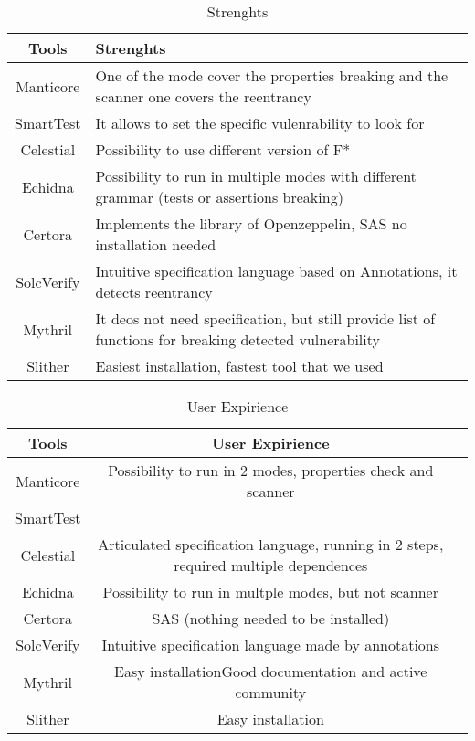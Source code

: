 \begin{table*}
\caption{Strenghts}
    \label{tab:Strenghts}
    \begin{tabular}{cl}
    \toprule
        Tools  &  Strenghts \\
        \midrule
        Manticore & One of the mode cover the properties breaking and the scanner one covers the reentrancy\\
        SmartTest & It allows to set the specific vulenrability to look for  \\
        Celestial & Possibility to use different version of F*  \\
        Echidna &  Possibility to run in multiple modes with different grammar (tests or assertions breaking)\\
        Certora & Implements the library of Openzeppelin, SAS no installation needed \\ 
        SolcVerify & Intuitive specification language based on Annotations, it detects reentrancy\\
        Mythril & It deos not need specification, but still provide list of functions for breaking detected vulnerability  \\ 
        Slither & Easiest installation, fastest tool that we used \\ 
    \bottomrule
    \end{tabular}
\end{table*}

\begin{table*}
    \caption{User Expirience}
    \label{tab:UX}
    \begin{tabular}{ccl}
    \toprule
        Tools  &  User Expirience \\
        \midrule
        Manticore & Possibility to run in 2 modes, properties check and scanner  \\
        SmartTest &  \\
        Celestial & Articulated specification language, running in 2 steps, required multiple dependences \\
        Echidna & Possibility to run in multple modes, but not scanner \\
        Certora & SAS (nothing needed to be installed) \\ 
        SolcVerify & Intuitive specification language made by annotations \\
        Mythril  & Easy installationGood documentation and active community \\ 
        Slither & Easy installation \\   
    \bottomrule
    \end{tabular}
\end{table*}

